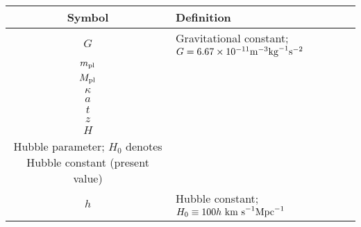 
\begin{tabular}{cl}
\hline\hline
Symbol & Definition \\
\hline
$G$ & Gravitational constant; $G=6.67\times10^{-11}\rm{m}^{-3}\rm{kg}^{-1}\rm{s}^{-2}$ \\
$m_{\text{\scriptsize pl}}$ & \\
$M_{\text{\scriptsize pl}}$ & \\
$\kappa$ & \\
$a$ & \\
$t$ & \\
$z$ & \\
$H$ & \\ Hubble parameter; $H_0$ denotes Hubble constant (present value) \\
$h$ & Hubble constant; $H_0\equiv100 h \rm{\ km\ s}^{-1}\rm{Mpc}^{-1}$ \\
\hline\hline
\end{tabular}